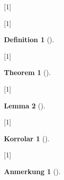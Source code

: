 
\usepackage{environ}
\usepackage[utf8]{inputenc}
\usepackage[fleqn]{amsmath}
\usepackage{amsthm}
\usepackage{amssymb}
\usepackage{nameref}
\usepackage{enumitem}
\usepackage{babel}

\setlength\parindent{0pt}

[1]{
	
}



\newtheorem{definition}{Definition}[section]
\newtheorem{theorem}{Theorem}[section]
\newtheorem{corollary}{Korrolar}[theorem]
\newtheorem{lemma}[theorem]{Lemma}
\newtheorem*{remark}{Anmerkung}

\renewcommand*{\proofname}{Beweis}

[1]{
	\begin{definition}[#1]
		\label{#1}
		\BODY
	\end{definition}
}

[1]{
	\begin{theorem}[#1]
		\label{#1}
		\BODY
	\end{theorem}
}

[1]{
	\begin{lemma}[#1]
		\label{#1}
		\BODY
	\end{lemma}
}

[1]{
	\begin{corollary}[#1]
		\label{#1}
		\BODY
	\end{corollary}
}

[1]{
	\begin{remark}[#1]
		\label{#1}
		\BODY
	\end{remark}
}

\let\proof\relax
\let\endproof\relax
{}

